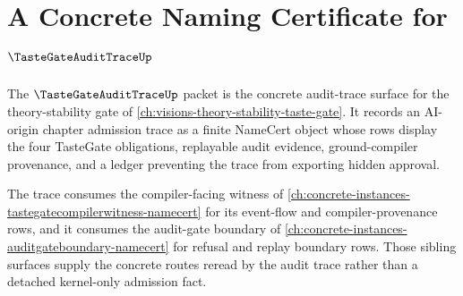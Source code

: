 \chapter{A Concrete Naming Certificate for $\TasteGateAuditTraceUp$}
\label{ch:concrete-instances-tastegateaudittrace-namecert}

The $\TasteGateAuditTraceUp$ packet is the concrete audit-trace surface for the theory-stability gate of \autoref{ch:visions-theory-stability-taste-gate}. It records an AI-origin chapter admission trace as a finite NameCert object whose rows display the four TasteGate obligations, replayable audit evidence, ground-compiler provenance, and a ledger preventing the trace from exporting hidden approval.

The trace consumes the compiler-facing witness of \autoref{ch:concrete-instances-tastegatecompilerwitness-namecert} for its event-flow and compiler-provenance rows, and it consumes the audit-gate boundary of \autoref{ch:concrete-instances-auditgateboundary-namecert} for refusal and replay boundary rows. Those sibling surfaces supply the concrete routes reread by the audit trace rather than a detached kernel-only admission fact.

